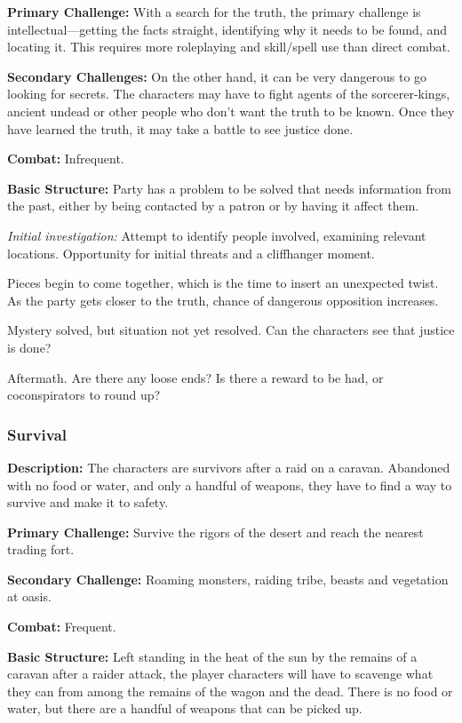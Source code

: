 \textbf{Primary Challenge:} With a search for the truth, the primary challenge is intellectual---getting the facts straight, identifying why it needs to be found, and locating it. This requires more roleplaying and skill/spell use than direct combat.

\textbf{Secondary Challenges:} On the other hand, it can be very dangerous to go looking for secrets. The characters may have to fight agents of the sorcerer-kings, ancient undead or other people who don't want the truth to be known. Once they have learned the truth, it may take a battle to see justice done.

\textbf{Combat:} Infrequent.

\textbf{Basic Structure:} Party has a problem to be solved that needs information from the past, either by being contacted by a patron or by having it affect them.

\textit{Initial investigation:} Attempt to identify people involved, examining relevant locations. Opportunity for initial threats and a cliffhanger moment.

Pieces begin to come together, which is the time to insert an unexpected twist. As the party gets closer to the truth, chance of dangerous opposition increases.

Mystery solved, but situation not yet resolved. Can the characters see that justice is done? 

Aftermath. Are there any loose ends? Is there a reward to be had, or coconspirators to round up?

\subsubsection{Survival}

\textbf{Description:} The characters are survivors after a raid on a caravan. Abandoned with no food or water, and only a handful of weapons, they have to find a way to survive and make it to safety.

\textbf{Primary Challenge:} Survive the rigors of the desert and reach the nearest trading fort.

\textbf{Secondary Challenge:} Roaming monsters, raiding tribe, beasts and vegetation at oasis.

\textbf{Combat:} Frequent.

\textbf{Basic Structure:} Left standing in the heat of the sun by the remains of a caravan after a raider attack, the player characters will have to scavenge what they can from among the remains of the wagon and the dead. There is no food or water, but there are a handful of weapons that can be picked up.

